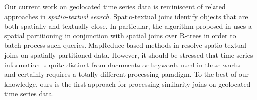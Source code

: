 Our current work on geolocated time series data is reminiscent of related approaches in {\em spatio-textual search}. Spatio-textual joins identify objects that are both spatially and textually close. In particular, the algorithm proposed in \cite{Bouros:2012:SSJ:2428536.2428537} uses a spatial partitioning in conjunction with spatial joins over R-trees in order to batch process such queries. MapReduce-based methods in \cite{Zhang:2014:ESS:2682647.2682773} resolve spatio-textual joins on spatially partitioned data. However, it should be stressed that time series information is quite distinct from documents or keywords used in those works and certainly requires a totally different processing paradigm. To the best of our knowledge, ours is the first approach for processing similarity joins on geolocated time series data.